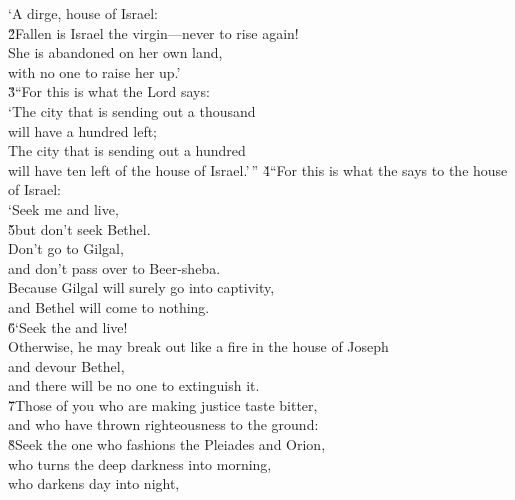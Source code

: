 \begin{poetry}
\poeml `A dirge, house of Israel: \\
\poeml \v{2}Fallen is Israel the virgin---never to rise again! \\
\poemll    She is abandoned on her own land, \\
\poemlll       with no one to raise her up.' \\
\poeml \v{3}``For this is what the Lord  says: \\
\poeml `The city that is sending out a thousand \\
\poemll    will have a hundred left; \\
\poeml The city that is sending out a hundred \\
\poemll    will have ten left of the house of Israel.'\,''
\poeml \v{4}``For this is what the  says to the house of Israel: \\
\poeml `Seek me and live, \\
\poeml \v{5}but don't seek Bethel. \\
\poeml Don't go to Gilgal, \\
\poemlll       and don't pass over to Beer-sheba. \\
\poeml Because Gilgal will surely go into captivity, \\
\poemll    and Bethel will come to nothing. \\
\poeml \v{6}`Seek the  and live! \\
\poemll    Otherwise, he may break out like a fire in the house of Joseph \\
\poemlll       and devour Bethel, \\
\poemll    and there will be no one to extinguish it. \\
\poeml \v{7}Those of you who are making justice taste bitter, \\
\poemll    and who have thrown righteousness to the ground: \\
\poeml \v{8}Seek the one who fashions the Pleiades and Orion, \\
\poemll    who turns the deep darkness into morning, \\
\poemll    who darkens day into night, \\

\end{poetry}
